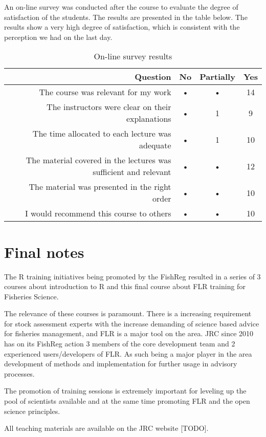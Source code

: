 \documentclass[a4paper]{article}
\begin{document}
An on-line survey was conducted after the course to evaluate the degree of satisfaction of the students. The results are presented in the table below. The results show a very high degree of satisfaction, which is consistent with the perception we had on the last day. 

\begin{table}[H]
\begin{center}
\begin{tabular}{rccc}
\hline 
Question & No & Partially & Yes \\ 
\hline 
\hline 
The course was relevant for my work & • & • & 14 \\ 
The instructors were clear on their explanations & • & 1 & 9 \\ 
The time allocated to each lecture was adequate & • & 1 & 10 \\ 
The material covered in the lectures was sufficient and relevant & • & • & 12 \\ 
The material was presented in the right order & • & • & 10 \\ 
I would recommend this course to others & • & • & 10 \\ 
\hline 
\end{tabular} 
\caption{On-line survey results}
\end{center}
\end{table} 


\section{Final notes}

The R training initiatives being promoted by the FishReg resulted in a series of 3 courses about introduction to R and this final course about FLR training for Fisheries Science.

The relevance of these courses is paramount. There is a increasing requirement for stock assessment experts with the increase demanding of science based advice for fisheries management, and FLR is a major tool on the area. JRC since 2010 has on its FishReg action 3 members of the core development team and 2 experienced users/developers of FLR. As such being a major player in the area development of methods and implementation for further usage in advisory processes.

The promotion of training sessions is extremely important for leveling up the pool of scientists available and at the same time promoting FLR and the open science principles.  

All teaching materials are available on the JRC website [TODO].
\end{document}

